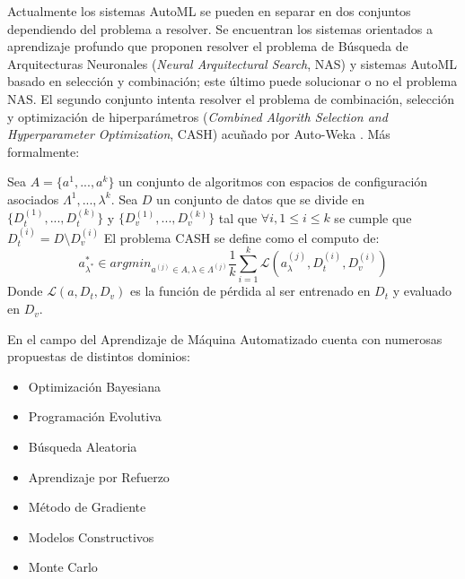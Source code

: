 Actualmente los sistemas AutoML se pueden en separar en dos conjuntos dependiendo del problema a resolver. Se encuentran los sistemas orientados a aprendizaje profundo que proponen resolver el problema de B\'usqueda de Arquitecturas Neuronales (\textit{Neural Arquitectural Search}, NAS) y  sistemas AutoML basado en selecci\'on y combinaci\'on; este \'ultimo puede solucionar o no el problema NAS. El segundo conjunto intenta resolver el problema de combinaci\'on, selecci\'on y optimizaci\'on de hiperpar\'ametros (\textit{Combined Algorith Selection and Hyperparameter Optimization}, CASH) acuñado por Auto-Weka . M\'as formalmente:
\begin{definition}
    Sea $A = \{a^1, ..., a^k\}$  un conjunto de algoritmos con espacios de configuraci\'on asociados $\Lambda^1, ..., \lambda^k$.
    Sea $D$ un conjunto de datos  que se divide en $\{D_{t}^{(1)},..., D_{t}^{(k)}\}$ y $\{D_{v}^{(1)},..., D_{v}^{(k)}\}$ 
    tal que $\forall i, 1 \leq i \leq k$ se cumple que $D_{t}^{(i)} = D \setminus D^{(i)}_{v}$
    El problema CASH se define como el computo de:
    \begin{equation*}
        a^*_{\lambda^*} \in argmin_{a^{(j)} \in A, \lambda \in \Lambda^{(j)}} \frac{1}{k} \sum^{k}_{i = 1}\mathcal{L}(a^(j)_\lambda, D^{(i)}_t, D^{(i)}_v)
    \end{equation*}
    Donde $\mathcal{L}(a, D_t, D_v)$ es la funci\'on de p\'erdida al ser entrenado en $D_t$ y evaluado en $D_v$.
\end{definition}



En el campo del Aprendizaje de M\'aquina Automatizado cuenta con numerosas propuestas de distintos dominios: 
\begin{itemize}
    \item Optimizaci\'on Bayesiana%
    \item Programaci\'on Evolutiva%
    \item B\'usqueda Aleatoria 
    \item Aprendizaje por Refuerzo
    \item M\'etodo de Gradiente
    \item Modelos Constructivos
    \item Monte Carlo
\end{itemize}

